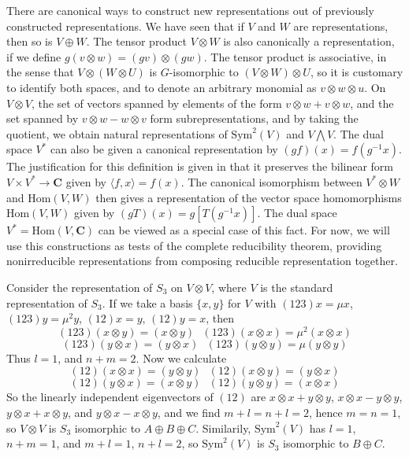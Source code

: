 There are canonical ways to construct new representations out of previously constructed representations. We have seen that if $V$ and $W$ are representations, then so is $V \oplus W$. The tensor product $V \otimes W$ is also canonically a representation, if we define $g(v \otimes w) = (gv) \otimes (gw)$. The tensor product is associative, in the sense that $V \otimes (W \otimes U)$ is $G$-isomorphic to $(V \otimes W) \otimes U$, so it is customary to identify both spaces, and to denote an arbitrary monomial as $v \otimes w \otimes u$. On $V \otimes V$, the set of vectors spanned by elements of the form $v \otimes w + v \otimes w$, and the set spanned by $v \otimes w - w \otimes v$ form subrepresentations, and by taking the quotient, we obtain natural representations of $\text{Sym}^2(V)$ and $V \bigwedge V$. The dual space $V^*$ can also be given a canonical representation by $(gf)(x) = f(g^{-1}x)$. The justification for this definition is given in that it preserves the bilinear form $V \times V^* \to \mathbf{C}$ given by $\langle f, x \rangle = f(x)$. The canonical isomorphism between $V^* \otimes W$ and $\text{Hom}(V,W)$ then gives a representation of the vector space homomorphisms $\text{Hom}(V,W)$ given by $(gT)(x) = g[T(g^{-1}x)]$. The dual space $V^* = \text{Hom}(V,\mathbf{C})$ can be viewed as a special case of this fact. For now, we will use this constructions as tests of the complete reducibility theorem, providing nonirreducible representations from composing reducible representation together.

\begin{example}
    Consider the representation of $S_3$ on $V \otimes V$, where $V$ is the standard representation of $S_3$. If we take a basis $\{ x, y \}$ for $V$ with $(1 2 3)x = \mu x$, $(1 2 3)y = \mu^2 y$, $(1 2) x = y$, $(1 2) y = x$, then
    \[ (1 2 3)(x \otimes y) = (x \otimes y)\ \ \ (1 2 3)(x \otimes x) = \mu^2 (x \otimes x) \]
    \[ (1 2 3)(y \otimes x) = (y \otimes x)\ \ \ (1 2 3)(y \otimes y) = \mu (y \otimes y) \]
    Thus $l = 1$, and $n + m = 2$. Now we calculate
    \[ (1 2)(x \otimes x) = (y \otimes y)\ \ \ (1 2)(x \otimes y) = (y \otimes x) \]
    \[ (1 2)(y \otimes x) = (x \otimes y)\ \ \ (1 2)(y \otimes y) = (x \otimes x) \]
    So the linearly independent eigenvectors of $(1 2)$ are $x \otimes x + y \otimes y$, $x \otimes x - y \otimes y$, $y \otimes x + x \otimes y$, and $y \otimes x - x \otimes y$, and we find $m + l = n + l = 2$, hence $m = n = 1$, so $V \otimes V$ is $S_3$ isomorphic to $A \oplus B \oplus C$. Similarily, $\text{Sym}^2(V)$ has $l = 1$, $n + m = 1$, and $m + l = 1$, $n + l = 2$, so $\text{Sym}^2(V)$ is $S_3$ isomorphic to $B \oplus C$.
\end{example}


